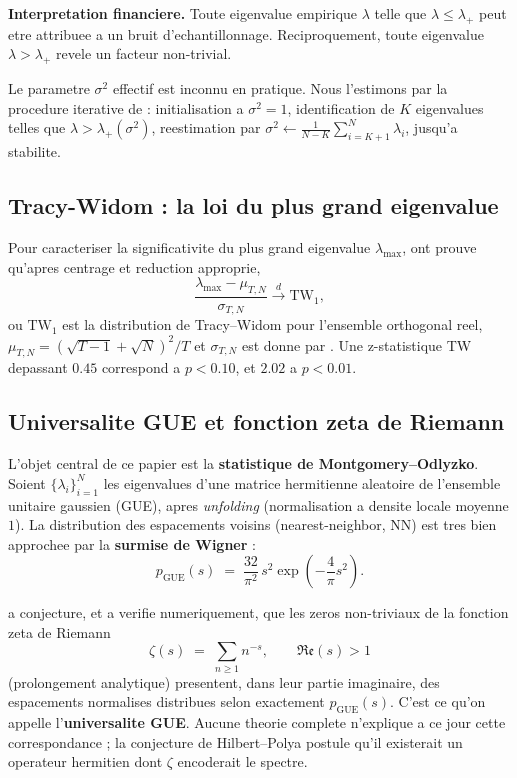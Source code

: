 \documentclass[11pt,a4paper]{article}
\begin{document}
\noindent\textbf{Interpretation financiere.} Toute eigenvalue empirique $\lambda$ telle que $\lambda \le \lambda_+$ peut etre attribuee a un bruit d'echantillonnage. Reciproquement, toute eigenvalue $\lambda > \lambda_+$ revele un facteur non-trivial.

Le parametre $\sigma^2$ effectif est inconnu en pratique. Nous l'estimons par la procedure iterative de \citet{Laloux1999} : initialisation a $\sigma^2 = 1$, identification de $K$ eigenvalues telles que $\lambda > \lambda_+(\sigma^2)$, reestimation par $\sigma^2 \leftarrow \frac{1}{N - K} \sum_{i = K+1}^{N} \lambda_i$, jusqu'a stabilite.

\subsection{Tracy-Widom : la loi du plus grand eigenvalue}

Pour caracteriser la significativite du plus grand eigenvalue $\lambda_{\max}$, \citet{Tracy1994} ont prouve qu'apres centrage et reduction approprie,
\begin{equation}
\frac{\lambda_{\max} - \mu_{T,N}}{\sigma_{T,N}} \xrightarrow{d} \mathrm{TW}_1,
\label{eq:TW}
\end{equation}
ou $\mathrm{TW}_1$ est la distribution de Tracy--Widom pour l'ensemble orthogonal reel, $\mu_{T,N} = (\sqrt{T-1} + \sqrt{N})^2 / T$ et $\sigma_{T,N}$ est donne par \citet{Johnstone2001}. Une z-statistique TW depassant $0.45$ correspond a $p < 0.10$, et $2.02$ a $p < 0.01$.

\subsection{Universalite GUE et fonction zeta de Riemann}
\label{sec:zeta}

L'objet central de ce papier est la \textbf{statistique de Montgomery--Odlyzko}. Soient $\{\lambda_i\}_{i=1}^N$ les eigenvalues d'une matrice hermitienne aleatoire de l'ensemble unitaire gaussien (GUE), apres \emph{unfolding} (normalisation a densite locale moyenne $1$). La distribution des espacements voisins (nearest-neighbor, NN) est tres bien approchee par la \textbf{surmise de Wigner} :
\begin{equation}
p_{\mathrm{GUE}}(s) \;=\; \frac{32}{\pi^2}\, s^2 \exp\!\left(-\frac{4}{\pi} s^2\right).
\label{eq:wigner}
\end{equation}

\citet{Montgomery1973} a conjecture, et \citet{Odlyzko1987} a verifie numeriquement, que les zeros non-triviaux de la fonction zeta de Riemann
\[ \zeta(s) \;=\; \sum_{n \ge 1} n^{-s}, \qquad \mathfrak{Re}(s) > 1 \]
(prolongement analytique) presentent, dans leur partie imaginaire, des espacements normalises distribues selon exactement $p_{\mathrm{GUE}}(s)$. C'est ce qu'on appelle l'\textbf{universalite GUE}. Aucune theorie complete n'explique a ce jour cette correspondance ; la conjecture de Hilbert--Polya postule qu'il existerait un operateur hermitien dont $\zeta$ encoderait le spectre.
\end{document}
